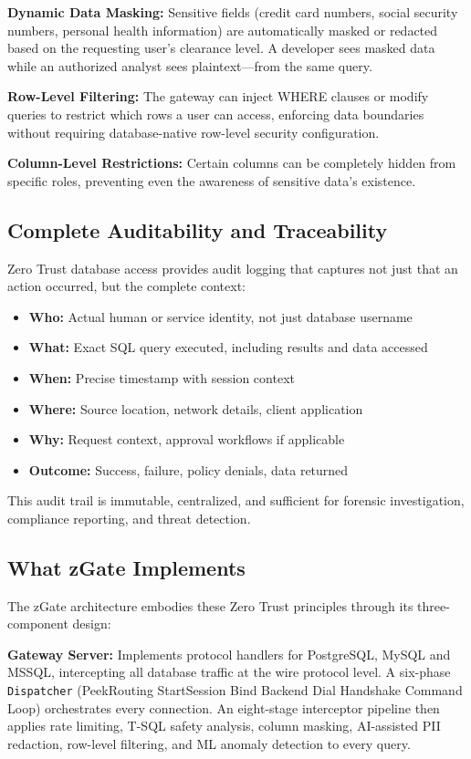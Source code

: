\textbf{Dynamic Data Masking:} Sensitive fields (credit card numbers, social security numbers, personal health information) are automatically masked or redacted based on the requesting user's clearance level. A developer sees masked data while an authorized analyst sees plaintext—from the same query.

\textbf{Row-Level Filtering:} The gateway can inject WHERE clauses or modify queries to restrict which rows a user can access, enforcing data boundaries without requiring database-native row-level security configuration.

\textbf{Column-Level Restrictions:} Certain columns can be completely hidden from specific roles, preventing even the awareness of sensitive data's existence.

\subsection{Complete Auditability and Traceability}
Zero Trust database access provides audit logging that captures not just that an action occurred, but the complete context:
\begin{itemize}
    \item \textbf{Who:} Actual human or service identity, not just database username
    \item \textbf{What:} Exact SQL query executed, including results and data accessed
    \item \textbf{When:} Precise timestamp with session context
    \item \textbf{Where:} Source location, network details, client application
    \item \textbf{Why:} Request context, approval workflows if applicable
    \item \textbf{Outcome:} Success, failure, policy denials, data returned
\end{itemize}

This audit trail is immutable, centralized, and sufficient for forensic investigation, compliance reporting, and threat detection.

\subsection{What zGate Implements}
The zGate architecture embodies these Zero Trust principles through its three-component design:

\textbf{Gateway Server:} Implements protocol handlers for PostgreSQL, MySQL and MSSQL, intercepting all database traffic at the wire protocol level. A six-phase \texttt{Dispatcher} (PeekRouting \textrightarrow{} StartSession \textrightarrow{} Bind \textrightarrow{} Backend Dial \textrightarrow{} Handshake \textrightarrow{} Command Loop) orchestrates every connection. An eight-stage interceptor pipeline then applies rate limiting, T-SQL safety analysis, column masking, AI-assisted PII redaction, row-level filtering, and ML anomaly detection to every query.

